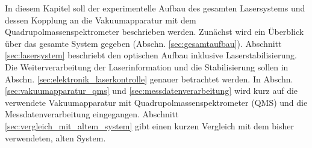 In diesem Kapitel soll der experimentelle Aufbau des gesamten Lasersystems und
dessen Kopplung an die Vakuumapparatur mit dem Quadrupolmassenspektrometer
beschrieben werden.
Zunächst wird ein Überblick über das gesamte System gegeben (Abschn.
\ref{sec:gesamtaufbau}). Abschnitt \ref{sec:lasersystem} beschriebt den
optischen Aufbau inklusive Laserstabilisierung. Die Weiterverarbeitung der
Laserinformation und die Stabilisierung sollen in Abschn.
\ref{sec:elektronik_laserkontrolle} genauer betrachtet werden. In Abschn.
\ref{sec:vakuumapparatur_qms} und \ref{sec:messdatenverarbeitung} wird kurz
auf die verwendete Vakuumapparatur mit Quadrupolmassenspektrometer (QMS) und die
Messdatenverarbeitung eingegangen.
Abschnitt \ref{sec:vergleich_mit_altem_system} gibt einen kurzen Vergleich mit dem
bisher verwendeten, alten System.

